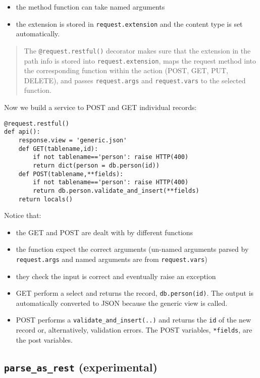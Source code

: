 \documentclass[justified,sixbynine,notoc]{tufte-book}
\def\ft{\small\tt}
\begin{document}
\begin{fullwidth}
\begin{itemize}
\item the method function can take named arguments

\item the extension is stored in {\ft request.extension} and the content type is set automatically.
\end{itemize}

\begin{quote}The {\ft @request.restful()} decorator makes sure that the extension in the path info is stored into {\ft request.extension}, maps the request method into the corresponding function within the action (POST, GET, PUT, DELETE), and passes {\ft request.args} and {\ft request.vars} to the selected function.\end{quote}
Now we build a service to POST and GET individual records:

\begin{lstlisting}
@request.restful()
def api():
    response.view = 'generic.json'
    def GET(tablename,id):
        if not tablename=='person': raise HTTP(400)
        return dict(person = db.person(id))
    def POST(tablename,**fields):
        if not tablename=='person': raise HTTP(400)
        return db.person.validate_and_insert(**fields)
    return locals()
\end{lstlisting}

Notice that:
\begin{itemize}
\item the GET and POST are dealt with by different functions

\item the function expect the correct arguments (un-named arguments parsed by {\ft request.args} and named arguments are from {\ft request.vars})

\item they check the input is correct and eventually raise an exception

\item GET perform a select and returns the record, {\ft db.person(id)}. The output is automatically converted to JSON because the generic view is called.

\item POST performs a {\ft validate\_and\_insert(..)} and returns the {\ft id} of the new record or, alternatively, validation errors. The POST variables, {\ft **fields}, are the post variables.
\end{itemize}

\goodbreak\subsection{{\ft parse\_as\_rest} (experimental)}


\end{fullwidth}
\end{document}

